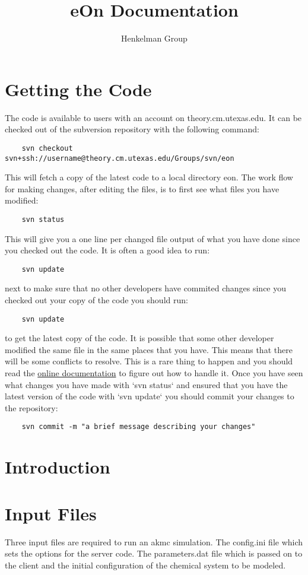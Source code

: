 \documentclass{article}
\begin{document}
\title{eOn Documentation}
\author{Henkelman Group}
\maketitle
\section{Getting the Code}
The code is available to users with an account on theory.cm.utexas.edu. It can
be checked out of the subversion repository with the following command:
\begin{verbatim}
    svn checkout svn+ssh://username@theory.cm.utexas.edu/Groups/svn/eon 
\end{verbatim}
This will fetch a copy of the latest code to a local directory eon.
The work flow for making changes, after editing the files, is to first see what
files you have modified:
\begin{verbatim}
    svn status
\end{verbatim}
This will give you a one line per changed file output of what you have done
since you checked out the code. It is often a good idea to run:
\begin{verbatim}
    svn update
\end{verbatim}
next to make sure that no other developers have commited changes since you
checked out your copy of the code you should run:
\begin{verbatim}
    svn update
\end{verbatim}
to get the latest copy of the code. It is possible that some other developer
modified the same file in the same places that you have. This means that there
will be some conflicts to resolve. This is a rare thing to happen and you
should read the \href{http://svnbook.red-bean.com/en/1.5/index.html}{online documentation} to figure out how to handle it. Once you have seen what changes you have made with `svn status` and ensured that you have the latest version of the code with `svn update` you should commit your changes to the repository:
\begin{verbatim}
    svn commit -m "a brief message describing your changes"
\end{verbatim}

\section{Introduction}

\section{Input Files}
Three input files are required to run an akmc simulation. The config.ini file
which sets the options for the server code. The parameters.dat file which is
passed on to the client and the initial configuration of the chemical system to
be modeled.
\end{document}
